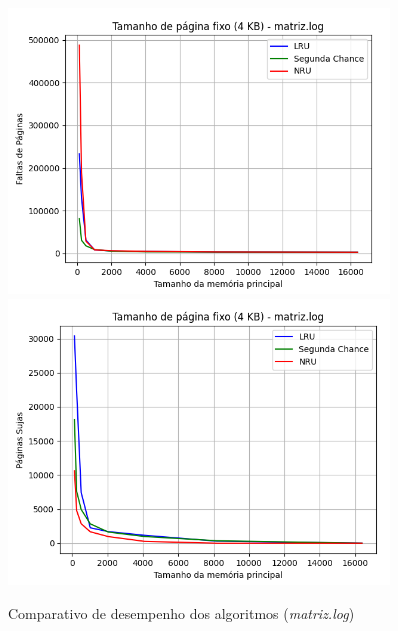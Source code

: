 \documentclass[a4paper, 12pt]{article}
\begin{document}
\begin{figure}[H]
    \centering
    \includegraphics[width=0.9\textwidth]{fixed_pag/matriz/fault.png}
    \hspace{1.5cm}
    \includegraphics[width=0.9\textwidth]{fixed_pag/matriz/write.png}
    \caption{Comparativo de desempenho dos algoritmos (\emph{matriz.log})}
    \label{fig:exampleFig5}
\end{figure}
\end{document}
